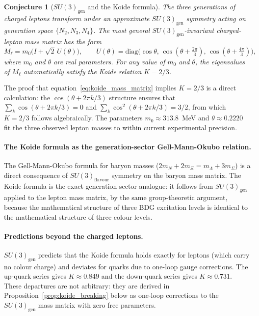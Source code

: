 \documentclass[11pt,a4paper]{article}
\newtheorem{conjecture}[theorem]{Conjecture}
\begin{document}
\begin{conjecture}[$SU(3)_{\mathrm{gen}}$ and the Koide formula]
\label{conj:koide}
The three generations of charged leptons transform under an approximate
$SU(3)_{\mathrm{gen}}$ symmetry acting on generation space $\{N_2, N_3, N_4\}$.
The most general $SU(3)_{\mathrm{gen}}$-invariant charged-lepton mass matrix
has the form
\begin{equation}
  M_\ell = m_0\bigl(I + \sqrt{2}\,U(\theta)\bigr),
  \qquad
  U(\theta) = \mathrm{diag}\bigl(\cos\theta,\,
  \cos(\theta+\tfrac{2\pi}{3}),\, \cos(\theta+\tfrac{4\pi}{3})\bigr),
  \label{eq:koide_mass_matrix}
\end{equation}
where $m_0$ and $\theta$ are real parameters. For any value of $m_0$ and
$\theta$, the eigenvalues of $M_\ell$ automatically satisfy the Koide relation
$K = 2/3$.
\end{conjecture}

The proof that equation~\eqref{eq:koide_mass_matrix} implies $K = 2/3$
is a direct calculation: the $\cos(\theta + 2\pi k/3)$ structure ensures
that $\sum_k \cos(\theta + 2\pi k/3) = 0$ and
$\sum_k \cos^2(\theta + 2\pi k/3) = 3/2$, from which $K = 2/3$ follows
algebraically. The parameters $m_0 \approx 313.8$~MeV and $\theta \approx
0.2220$ fit the three observed lepton masses to within current experimental
precision.

\paragraph{The Koide formula as the generation-sector Gell-Mann-Okubo relation.}
The Gell-Mann-Okubo formula for baryon masses ($2m_N + 2m_\Xi = m_\Lambda + 3m_\Sigma$)
is a direct consequence of $SU(3)_{\mathrm{flavour}}$ symmetry on the baryon
mass matrix. The Koide formula is the exact generation-sector analogue: it
follows from $SU(3)_{\mathrm{gen}}$ applied to the lepton mass matrix, by
the same group-theoretic argument, because the mathematical structure of three
BDG excitation levels is identical to the mathematical structure of three
colour levels.

\paragraph{Predictions beyond the charged leptons.}
$SU(3)_{\mathrm{gen}}$ predicts that the Koide formula holds exactly for
leptons (which carry no colour charge) and deviates for quarks due to
one-loop gauge corrections. The up-quark series gives $K \approx 0.849$
and the down-quark series gives $K \approx 0.731$. These departures are
not arbitrary: they are derived in Proposition~\ref{prop:koide_breaking}
below as one-loop corrections to the $SU(3)_{\mathrm{gen}}$ mass matrix
with zero free parameters.
\end{document}
